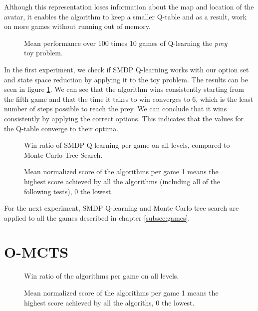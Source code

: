 Although this representation loses information about the map and location
of the avatar, it enables the algorithm to keep a smaller Q-table and as a
result, work on more games without running out of memory.

\begin{figure}
	\centering
	\caption{Mean performance over 100 times 10 games of Q-learning the
	\textit{prey} toy problem.}
	\label{fig:qlearning}
\end{figure}

In the first experiment, we check if SMDP Q-learning works with our option set
and state space reduction by applying it to the toy problem. The results can be
seen in figure \ref{fig:qlearning}. We can see that the algorithm wins
consistently starting from the fifth game and that the time it takes to win
converges to 6, which is the least number of steps possible to reach the prey.
We can conclude that it wins consistently by applying the correct options. This
indicates that the values for the Q-table converge to their optima.

\begin{figure}
	\centering
	\vspace{-.8cm}
	\caption{Win ratio of SMDP Q-learning per game on all levels, compared to Monte Carlo Tree Search.}
	\label{fig:wins}
	\centering
	\vspace{-.8cm}
	\caption{Mean normalized score of the algorithms per game 1 means the
	highest score achieved by all the algorithms (including all of the following
tests), 0 the lowest.}
	\label{fig:scores}
\end{figure}

For the next experiment, SMDP Q-learning and Monte Carlo tree search are applied
to all the games described in chapter \ref{subsec:games}. 

\section{O-MCTS}
\label{subsec:omcts}
\begin{figure}
	\centering
	\vspace{-.8cm}
	\caption{Win ratio of the algorithms per game on all levels.}
	\label{fig:wins}
	\centering
	\vspace{-.8cm}
	\caption{Mean normalized score of the algorithms per game 1 means the
	highest score achieved by all the algoriths, 0 the lowest.}
	\label{fig:scores}
\end{figure}

